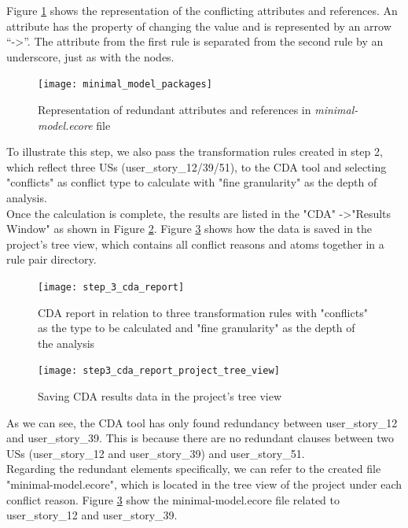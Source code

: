 Figure \ref{fig:minimal_model_packages} shows the representation of the conflicting attributes and references. An attribute has the property of changing the value and is represented by an arrow \enquote{-\textgreater}. The attribute from the first rule is separated from the second rule by an underscore, just as with the nodes.
\begin{figure}[h]
	\centering
	\texttt{[image: minimal\_model\_packages]}
	\caption{Representation of redundant attributes and references in \textit{minimal-model.ecore} file}\label{fig:minimal_model_packages}
\end{figure}
\begin{example}
	To illustrate this step, we also pass the transformation rules created in step 2, which reflect three USs (user\_story\_12/39/51), to the CDA tool and selecting "conflicts" as conflict type to calculate with "fine granularity" as the depth of analysis.\\
	Once the calculation is complete, the results are listed in the "CDA" -\textgreater "Results Window" as shown in Figure \ref{fig:step_3_cda_report}. Figure \ref{fig:step3_cda_report_project_tree_view} shows how the data is saved in the project's tree view, which contains all conflict reasons and atoms together in a rule pair directory.
	\begin{figure}[h]
		\centering
		\texttt{[image: step\_3\_cda\_report]}
		\caption{CDA report in relation to three transformation rules with "conflicts" as the type to be calculated and "fine granularity" as the depth of the analysis}\label{fig:step_3_cda_report}
	\end{figure}
	\begin{figure}[h]
		\centering
		\texttt{[image: step3\_cda\_report\_project\_tree\_view]}
		\caption{Saving CDA results data in the project's tree view}\label{fig:step3_cda_report_project_tree_view}
	\end{figure}
	As we can see, the CDA tool has only found redundancy between user\_story\_12 and user\_story\_39. This is because there are no redundant clauses between two USs (user\_story\_12 and user\_story\_39) and user\_story\_51.\\
	Regarding the redundant elements specifically, we can refer to the created file "minimal-model.ecore", which is located in the tree view of the project under each conflict reason. Figure \ref{fig:step3_cda_report_project_tree_view} show the minimal-model.ecore file related to user\_story\_12 and user\_story\_39.\\\\

\end{example}
